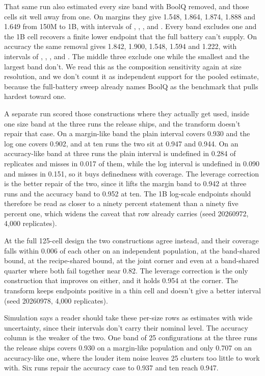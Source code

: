 That same run also estimated every size band with BoolQ removed, and those cells sit well away from one. On margins they give 1.548, 1.864, 1.874, 1.888 and 1.649 from 150M to 1B, with intervals of , , ,  and . Every band excludes one and the 1B cell recovers a finite lower endpoint that the full battery can't supply. On accuracy the same removal gives 1.842, 1.900, 1.548, 1.594 and 1.222, with intervals of , , ,  and . The middle three exclude one while the smallest and the largest band don't. We read this as the composition sensitivity again at size resolution, and we don't count it as independent support for the pooled estimate, because the full-battery sweep already names BoolQ as the benchmark that pulls hardest toward one.

A separate run scored those constructions where they actually get used, inside one size band at the three runs the release ships, and the transform doesn't repair that case. On a margin-like band the plain interval covers 0.930 and the log one covers 0.902, and at ten runs the two sit at 0.947 and 0.944. On an accuracy-like band at three runs the plain interval is undefined in 0.284 of replicates and misses in 0.017 of them, while the log interval is undefined in 0.090 and misses in 0.151, so it buys definedness with coverage. The leverage correction is the better repair of the two, since it lifts the margin band to 0.942 at three runs and the accuracy band to 0.952 at ten. The 1B log-scale endpoints should therefore be read as closer to a ninety percent statement than a ninety five percent one, which widens the caveat that row already carries (seed 20260972, 4,000 replicates).

At the full 125-cell design the two constructions agree instead, and their coverage falls within 0.006 of each other on an independent population, at the band-shared bound, at the recipe-shared bound, at the joint corner and even at a band-shared quarter where both fail together near 0.82. The leverage correction is the only construction that improves on either, and it holds 0.954 at the corner. The transform keeps endpoints positive in a thin cell and doesn't give a better interval (seed 20260978, 4,000 replicates).

Simulation says a reader should take these per-size rows as estimates with wide uncertainty, since their intervals don't carry their nominal level. The accuracy column is the weaker of the two. One band of 25 configurations at the three runs the release ships covers 0.930 on a margin-like population and only 0.707 on an accuracy-like one, where the louder item noise leaves 25 clusters too little to work with. Six runs repair the accuracy case to 0.937 and ten reach 0.947.


